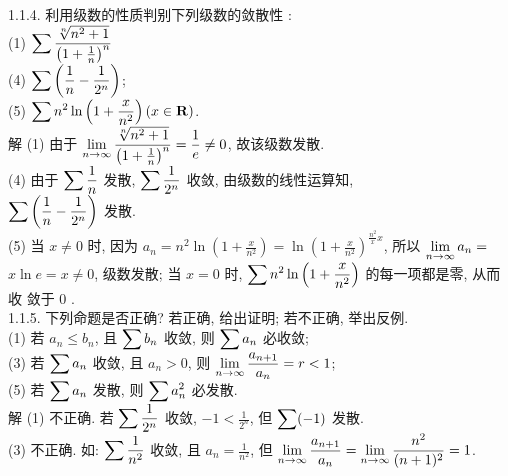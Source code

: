 \documentclass[a4paper,11pt,UTF8]{article}
\begin{document}
1.1.4. 利用级数的性质判别下列级数的敛散性 :\\
(1) $\displaystyle \displaystyle \displaystyle \sum \frac{\sqrt[n]{n^2+1}}{\left(1+\frac{1}{n}\right)^n}$\\
(4) $\displaystyle \displaystyle \displaystyle \sum\left(\frac{1}{n}-\frac{1}{2^n}\right)$;\\
(5) $\displaystyle \displaystyle \displaystyle \sum n^2 \ln \left(1+\frac{x}{n^2}\right)(x \in \mathbf{R})$.\\
解 (1) 由于 $\displaystyle \displaystyle \displaystyle \lim _{n \rightarrow \infty} \frac{\sqrt[n]{n^2+1}}{\left(1+\frac{1}{n}\right)^n}=\frac{1}{e} \neq 0$, 故该级数发散.\\
(4) 由于 $\displaystyle \displaystyle \displaystyle \sum \frac{1}{n}$ 发散, $\displaystyle \displaystyle \displaystyle \sum \frac{1}{2^n}$ 收敛, 由级数的线性运算知,\\$\displaystyle \displaystyle \displaystyle \sum\left(\frac{1}{n}-\frac{1}{2^n}\right)$ 发散.\\
(5) 当 $x \neq 0$ 时, 因为 $a_n=n^2 \ln \left(1+\frac{x}{n^2}\right)=\ln \left(1+\frac{x}{n^2}\right)^{\frac{n^2}{x} x}$, 所以 $\displaystyle \displaystyle \displaystyle \lim _{n \rightarrow \infty} a_n=$ $x \ln e=x \neq 0$, 级数发散; 当 $x=0$ 时, $\displaystyle \displaystyle \displaystyle \sum n^2 \ln \left(1+\frac{x}{n^2}\right)$ 的每一项都是零, 从而收 敛于 0 .\\
1.1.5. 下列命题是否正确? 若正确, 给出证明; 若不正确, 举出反例.\\
(1) 若 $a_n \leq b_n$, 且 $\displaystyle \displaystyle \displaystyle \sum b_n$ 收敛, 则 $\displaystyle \displaystyle \displaystyle \sum a_n$ 必收敛;\\
(3) 若 $\displaystyle \displaystyle \displaystyle \sum a_n$ 收敛, 且 $a_n>0$, 则 $\displaystyle \displaystyle \displaystyle \lim _{n \rightarrow \infty} \frac{a_{n+1}}{a_n}=r<1$;\\
(5) 若 $\displaystyle \displaystyle \displaystyle \sum a_n$ 发散, 则 $\displaystyle \displaystyle \displaystyle \sum a_n^2$ 必发散.\\
解 (1) 不正确. 若 $\displaystyle \displaystyle \displaystyle \sum \frac{1}{2^n}$ 收敛, $-1<\frac{1}{2^n}$, 但 $\displaystyle \displaystyle \displaystyle \sum(-1)$ 发散.\\
(3) 不正确. 如: $\displaystyle \displaystyle \displaystyle \sum \frac{1}{n^2}$ 收敛, 且 $a_n=\frac{1}{n^2}$, 但 $\displaystyle \displaystyle \displaystyle \lim _{n \rightarrow \infty} \frac{a_{n+1}}{a_n}=\lim _{n \rightarrow \infty} \frac{n^2}{(n+1)^2}=1$.\\
\end{document}
